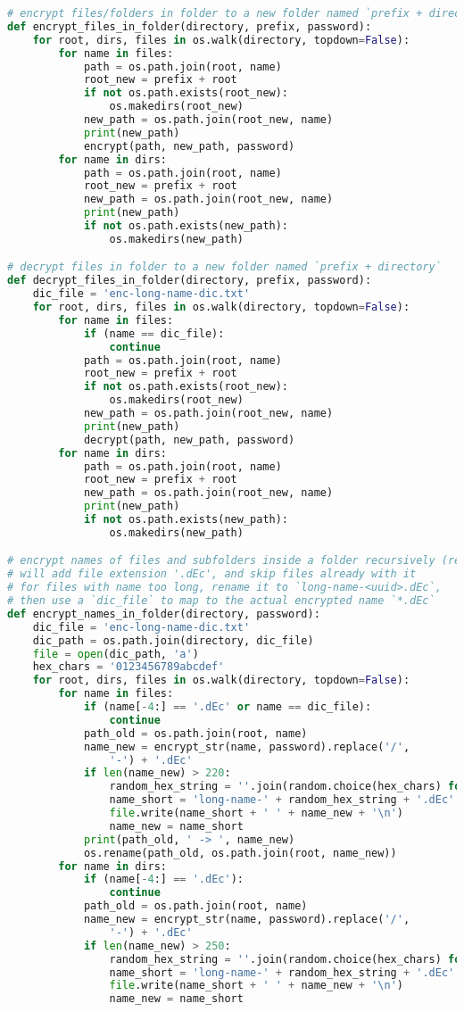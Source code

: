 \begin{lstlisting}[language=python,caption=encrypt.py]
# encrypt files/folders in folder to a new folder named `prefix + directory`
def encrypt_files_in_folder(directory, prefix, password):
	for root, dirs, files in os.walk(directory, topdown=False):
		for name in files:
			path = os.path.join(root, name)
			root_new = prefix + root
			if not os.path.exists(root_new):
				os.makedirs(root_new)
			new_path = os.path.join(root_new, name)
			print(new_path)
			encrypt(path, new_path, password)
		for name in dirs:
			path = os.path.join(root, name)
			root_new = prefix + root
			new_path = os.path.join(root_new, name)
			print(new_path)
			if not os.path.exists(new_path):
				os.makedirs(new_path)

# decrypt files in folder to a new folder named `prefix + directory`
def decrypt_files_in_folder(directory, prefix, password):
	dic_file = 'enc-long-name-dic.txt'
	for root, dirs, files in os.walk(directory, topdown=False):
		for name in files:
			if (name == dic_file):
				continue
			path = os.path.join(root, name)
			root_new = prefix + root
			if not os.path.exists(root_new):
				os.makedirs(root_new)
			new_path = os.path.join(root_new, name)
			print(new_path)
			decrypt(path, new_path, password)
		for name in dirs:
			path = os.path.join(root, name)
			root_new = prefix + root
			new_path = os.path.join(root_new, name)
			print(new_path)
			if not os.path.exists(new_path):
				os.makedirs(new_path)

# encrypt names of files and subfolders inside a folder recursively (rename)
# will add file extension '.dEc', and skip files already with it
# for files with name too long, rename it to `long-name-<uuid>.dEc`,
# then use a `dic_file` to map to the actual encrypted name `*.dEc`
def encrypt_names_in_folder(directory, password):
	dic_file = 'enc-long-name-dic.txt'
	dic_path = os.path.join(directory, dic_file)
	file = open(dic_path, 'a')
	hex_chars = '0123456789abcdef'
	for root, dirs, files in os.walk(directory, topdown=False):
		for name in files:
			if (name[-4:] == '.dEc' or name == dic_file):
				continue
			path_old = os.path.join(root, name)
			name_new = encrypt_str(name, password).replace('/',
				'-') + '.dEc'
			if len(name_new) > 220:
				random_hex_string = ''.join(random.choice(hex_chars) for _ in range(32))
				name_short = 'long-name-' + random_hex_string + '.dEc'
				file.write(name_short + ' ' + name_new + '\n')
				name_new = name_short
			print(path_old, ' -> ', name_new)
			os.rename(path_old, os.path.join(root, name_new))
		for name in dirs:
			if (name[-4:] == '.dEc'):
				continue
			path_old = os.path.join(root, name)
			name_new = encrypt_str(name, password).replace('/',
				'-') + '.dEc'
			if len(name_new) > 250:
				random_hex_string = ''.join(random.choice(hex_chars) for _ in range(32))
				name_short = 'long-name-' + random_hex_string + '.dEc'
				file.write(name_short + ' ' + name_new + '\n')
				name_new = name_short
				

\end{lstlisting}
